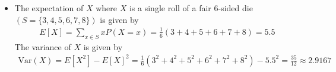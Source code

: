 \begin{itemize}
    \item [(e)] The expectation of $X$ where $X$ is a single roll of a fair 6-sided die $(S=\{3,4,5,6,7,8\})$ is given by
    \begin{align*}
        E[X] = \sum_{x\in S} xP(X=x) = \frac{1}{6}\left(3+4+5+6+7+8\right) = 5.5
    \end{align*}
    The variance of $X$ is given by
    \begin{align*}
        \text{Var}(X) = E[X^2] - E[X]^2 = \frac{1}{6}\left(3^2+4^2+5^2+6^2+7^2+8^2\right) - 5.5^2 = \frac{35}{12} \approx 2.9167
    \end{align*}

\end{itemize}






\newpage